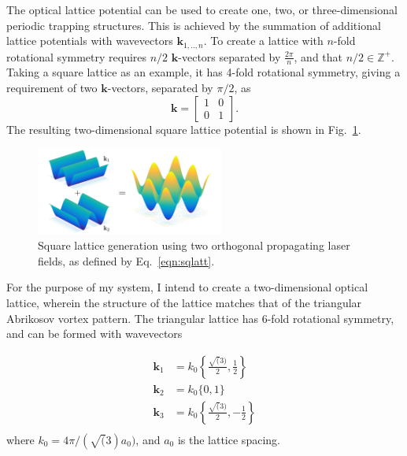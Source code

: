 {The optical lattice potential can be used to create one, two, or three-dimensional periodic trapping structures. This is achieved by the summation of additional lattice potentials with wavevectors $\mathbf{k}_{1,..,n}$. To create a lattice with $n$-fold rotational symmetry requires $n/2$ $\mathbf{k}$-vectors separated by $\frac{2\pi}{n}$, and that $n/2 \in \mathbb{Z}^{+}$. Taking a square lattice as an example, it has 4-fold rotational symmetry, giving a requirement of two $\mathbf{k}$-vectors, separated by $\pi/2$, as
\begin{equation}
    \mathbf{k} =
    \begin{bmatrix}
     1 & 0 \\
     0 & 1
    \end{bmatrix}.\label{eqn:sqlatt}
\end{equation}
The resulting two-dimensional square lattice potential is shown in Fig.~\ref{fig:cos2xy}.
\begin{figure}[tb]\centering
    \includegraphics[width=0.55\textwidth]{./Images/ch4_vtx/VOPT/squarelatt}
    \caption{Square lattice generation using two orthogonal propagating laser fields, as defined by Eq.~\ref{eqn:sqlatt}.}\label{fig:cos2xy}
\end{figure}

For the purpose of my system, I intend to create a two-dimensional optical lattice, wherein the structure of the lattice matches that of the triangular Abrikosov vortex pattern. The triangular lattice has 6-fold rotational symmetry, and can be formed with wavevectors

\begin{subequations}
    \begin{align}
        \mathbf{k}_1 &= k_0\left\{\frac{\sqrt(3)}{2},\frac{1}{2}\right\} \\
        \mathbf{k}_2 &= k_0\{0,1\} \\
        \mathbf{k}_3 &= k_0\left\{\frac{\sqrt(3)}{2},-\frac{1}{2}\right\} \\
    \end{align}
\end{subequations}
where $k_0 = 4\pi/(\sqrt(3)a_0)$, and $a_0$ is the lattice spacing.


}
